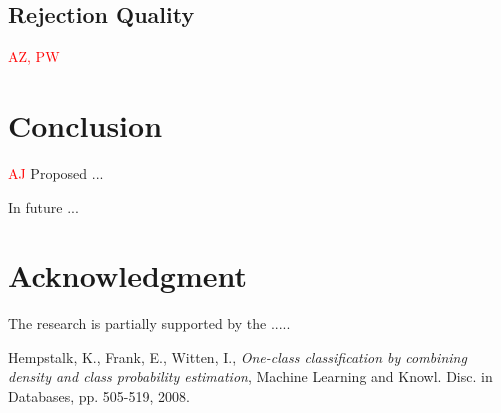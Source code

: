 \documentclass{llncs}
\begin{document}
\subsection{Rejection Quality}
\textcolor{red} {AZ, PW}



\section{Conclusion}
  \label{Conclusion}

\textcolor{red} {AJ}
Proposed ...

In future ...


\section*{Acknowledgment}

\noindent The research is partially supported by the .....

\begin{thebibliography}{1}

Hempstalk, K., Frank, E., Witten, I., \emph{One-class classification by combining density and class probability estimation}, Machine Learning and Knowl. Disc. in Databases, pp. 505-519, 2008.


\end{thebibliography}
\end{document}
